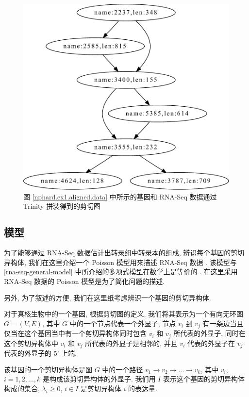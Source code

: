 \begin{figure}[!t]
\centering
\includegraphics[width=\textwidth]{figures/nphard/comp1.pdf}
\caption{图 \ref{nphard.ex1.aligned.data} 中所示的基因和 
RNA-Seq 数据通过 Trinity \cite{grabherr2011full} 拼装得到的剪切图}
\label{nphard.ex1.splicing.graph}
\end{figure}

\subsection{模型}

为了能够通过 RNA-Seq 数据估计出转录组中转录本的组成, 辨识每个基因的剪切异构体, 
我们在这里介绍一个 Poisson 模型用来描述 RNA-Seq 数据 \cite{Jiang15042009}. 
该模型与 \ref{rna-seq-general-model} 中所介绍的多项式模型在数学上是等价的 
\cite{2011arXiv1104.3889P}. 
在这里采用 RNA-Seq 数据的 Poisson 模型是为了简化问题的描述. 

另外, 为了叙述的方便, 我们在这里纸考虑辨识一个基因的剪切异构体. 

对于真核生物中的一个基因, 根据剪切图的定义, 
我们将其表示为一个有向无环图 $G=(V,E)$, 其中 $G$ 中的一个节点代表一个外显子, 
节点 $v_i$ 到 $v_j$ 有一条边当且仅当在这个基因当中有一个剪切异构体同时包含 
$v_i$ 和 $v_j$ 所代表的外显子, 
同时在这个剪切异构体中 $v_i$ 和 $v_j$ 所代表的外显子是相邻的, 
并且 $v_i$ 代表的外显子在 $v_j$ 代表的外显子的 5' 上端. 

该基因的一个剪切异构体是图 $G$ 中的一个路径 $v_1 \to v_2 \to \ldots \to v_k$, 
其中 $v_i$, $i=1,2,\ldots,k$ 是构成该剪切异构体的外显子. 
我们用 $I$ 表示这个基因的剪切异构体构成的集合, $\lambda_i \geq 0$, 
$i \in I$ 是剪切异构体 $i$ 的表达量. 

